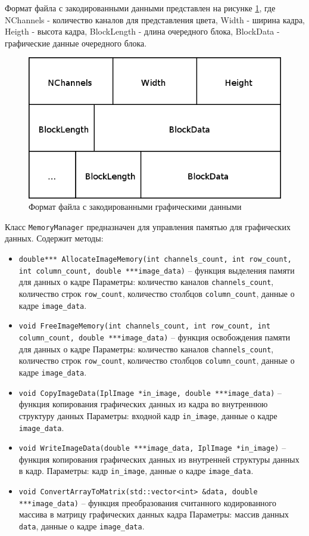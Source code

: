 Формат файла с закодированными данными представлен на рисунке \ref{fig:format}, где NChannels - количество каналов для представления цвета, Width - ширина кадра,
Heigth - высота кадра, BlockLength - длина очередного блока, BlockData - графические данные очередного блока.

\begin{figure}
  \centering
  \includegraphics[scale=0.5]{inc/graphics/format.png}
  \caption{Формат файла с закодированными графическими данными}
  \label{fig:format}
\end{figure}

Класс \texttt{MemoryManager} предназначен для управления памятью для графических данных. Содержит методы:
\begin{itemize}
 \item \texttt{double*** AllocateImageMemory(int channels\_count, int row\_count, int column\_count, double ***image\_data)} – 
 функция выделения памяти для данных о кадре Параметры: количество каналов \texttt{channels\_count}, 
 количество строк \texttt{row\_count}, количество столбцов \texttt{column\_count}, данные о кадре \texttt{image\_data}.
 \item \texttt{void FreeImageMemory(int channels\_count, int row\_count, int column\_count, double ***image\_data)} – 
 функция освобождения памяти для данных о кадре
 Параметры: количество каналов \texttt{channels\_count}, количество строк \texttt{row\_count}, 
 количество столбцов \texttt{column\_count}, данные о кадре \texttt{image\_data}.
 \item \texttt{void CopyImageData(IplImage *in\_image, double ***image\_data)} – функция копирования графических данных из кадра во внутреннюю структуру данных
 Параметры: входной кадр \texttt{in\_image},  данные о кадре \texttt{image\_data}.
 \item \texttt{void WriteImageData(double ***image\_data, IplImage *in\_image)} – функция копирования графических данных из внутренней структуры данных в кадр.
 Параметры: кадр \texttt{in\_image},  данные о кадре \texttt{image\_data}.
 \item \texttt{void ConvertArrayToMatrix(std::vector<int> \&data, double ***image\_data)} – функция преобразования считанного 
 кодированного массива в матрицу графических данных кадра
 Параметры: массив данных \texttt{data},  данные о кадре \texttt{image\_data}.
\end{itemize}

